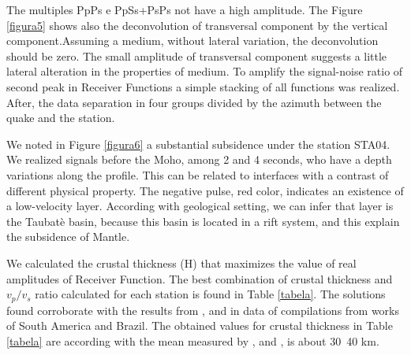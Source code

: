 \documentclass[twoside,letterpaper,twocolumn]{article}
\begin{document}
The multiples PpPs e PpSs+PsPs not have a high amplitude. The Figure \ref{figura5} shows also the deconvolution of transversal component by the vertical component.Assuming a medium, without lateral variation, the deconvolution should be zero. The small amplitude of transversal component suggests a little lateral alteration in the properties of medium. To amplify the signal-noise ratio of second peak in Receiver Functions a simple stacking of all functions was realized. After, the data separation in four groups divided by the azimuth between the quake and the station. 

We noted in Figure \ref{figura6} a substantial subsidence under the station STA04. We realized signals before the Moho, among 2 and 4 seconds, who have a depth variations along the profile. This can be related to interfaces with a contrast of different physical property. The negative pulse, red color, indicates an existence of a low-velocity layer. According with geological setting, we can infer that layer is the Taubat\`{e} basin, because this basin is located in a rift system, and this explain the subsidence of Mantle.

We calculated the crustal thickness (H) that maximizes the value of real amplitudes of Receiver Function. The best combination of crustal thickness and $v_{p}/v_{s}$ ratio calculated for each station is found in Table \ref{tabela}. The solutions found corroborate with the results from \cite{assumpcao_models_2013}, \cite{assumpcao_crustal_2013} and \cite{van_der_meijde_gravity_2013} in data of compilations from works of South America and Brazil. The obtained values for crustal thickness in Table \ref{tabela} are according with the mean measured by \cite{assumpcao_models_2013}, \cite{assumpcao_crustal_2013} and \cite{van_der_meijde_gravity_2013}, is about 30~40 km.
\end{document}
